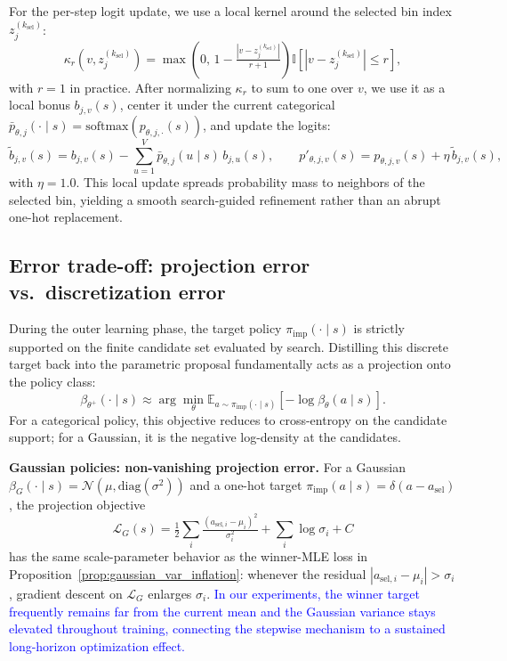 For the per-step logit update, we use a local kernel around the selected bin index $z^{(k_{\mathrm{sel}})}_j$:
\begin{equation}
\kappa_r\!\left(v, z^{(k_{\mathrm{sel}})}_j\right)
=
\max\!\left(0,\, 1 - \tfrac{|v-z^{(k_{\mathrm{sel}})}_j|}{r+1}\right)
\mathbb{I}\!\left[|v-z^{(k_{\mathrm{sel}})}_j| \le r\right],
\end{equation}
with $r=1$ in practice. After normalizing $\kappa_r$ to sum to one over $v$, we use it as a local bonus $b_{j,v}(s)$, center it under the current categorical $\bar p_{\theta,j}(\cdot\mid s)=\mathrm{softmax}(p_{\theta,j,\cdot}(s))$, and update the logits:
\begin{equation}
\tilde b_{j,v}(s)
=b_{j,v}(s)
-
\sum_{u=1}^{V}\bar p_{\theta,j}(u\mid s)\, b_{j,u}(s),
\qquad
p'_{\theta,j,v}(s)
=
p_{\theta,j,v}(s) + \eta\, \tilde b_{j,v}(s),
\end{equation}
with $\eta=1.0$. This local update spreads probability mass to neighbors of the selected bin, yielding a smooth search-guided refinement rather than an abrupt one-hot replacement.


\subsection{Error trade-off: projection error vs.\ discretization error}
\label{sec:tradeoff}

During the outer learning phase, the target policy $\pi_{\mathrm{imp}}(\cdot\mid s)$ is strictly supported on the finite candidate set evaluated by search. Distilling this discrete target back into the parametric proposal fundamentally acts as a projection onto the policy class:
\begin{equation}
    \beta_{\theta^+}(\cdot\mid s)
    \approx
    \arg\min_{\theta}
    \mathbb{E}_{a\sim \pi_{\mathrm{imp}}(\cdot\mid s)}\!\left[-\log\beta_\theta(a\mid s)\right].
    \label{eq:proj_def}
\end{equation}
For a categorical policy, this objective reduces to cross-entropy on the candidate support; for a Gaussian, it is the negative log-density at the candidates.

\textbf{Gaussian policies: non-vanishing projection error.}
For a Gaussian $\beta_G(\cdot\mid s)=\mathcal{N}(\mu,\mathrm{diag}(\sigma^2))$ and a one-hot target $\pi_{\mathrm{imp}}(a\mid s)=\delta(a-a_{\mathrm{sel}})$, the projection objective
\begin{equation}
    \mathcal{L}_G(s)
    =
    \tfrac{1}{2}\sum_i \tfrac{(a_{\mathrm{sel},i}-\mu_i)^2}{\sigma_i^2}
    +
    \sum_i \log \sigma_i + C
\end{equation}
has the same scale-parameter behavior as the winner-MLE loss in Proposition~\ref{prop:gaussian_var_inflation}: whenever the residual $|a_{\mathrm{sel},i}-\mu_i|>\sigma_i$, gradient descent on $\mathcal{L}_G$ enlarges $\sigma_i$. \textcolor{blue}{In our experiments, the winner target frequently remains far from the current mean and the Gaussian variance stays elevated throughout training, connecting the stepwise mechanism to a sustained long-horizon optimization effect.}

